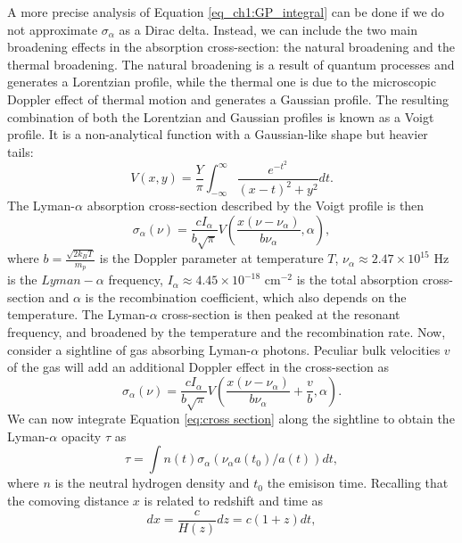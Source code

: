 A more precise analysis of Equation \ref{eq_ch1:GP_integral} can be done if we do not approximate $\sigma_\alpha$ as a Dirac delta. Instead, we can include the two main broadening effects in the absorption cross-section: the natural broadening and the thermal broadening. The natural broadening is a result of quantum processes and generates a Lorentzian profile, while the thermal one is due to the microscopic Doppler effect of thermal motion and generates a Gaussian profile. The resulting combination of both the Lorentzian and Gaussian profiles is known as a Voigt profile. It is a non-analytical function with a Gaussian-like shape but heavier tails:
\begin{equation}\label{eq: Voigt}
    V(x,y)=\frac{Y}{\pi}\int_{-\infty}^{\infty}\frac{e^{-t^2}}{(x-t)^2+y^2} dt.
\end{equation}
The Lyman-$\alpha$ absorption cross-section described by the Voigt profile is then
\begin{equation}
    \sigma_\alpha(\nu)=\frac{cI_\alpha}{b\sqrt{\pi}} V\left(\frac{x(\nu-\nu_\alpha)}{b\nu_\alpha}, \alpha  \right),
\end{equation}
where $b=\frac{\sqrt{2k_BT}}{m_p}$ is the Doppler parameter at temperature $T$, $\nu_\alpha \approx 2.47\times 10^{15}$ Hz is the $Lyman-\alpha$ frequency, $I_\alpha \approx 4.45\times 10^{-18}$ cm$^{-2}$ is the total absorption cross-section \cite{Mo2010} and $\alpha$ is the recombination coefficient, which also depends on the temperature.
The Lyman-$\alpha$ cross-section is then peaked at the resonant frequency, and broadened by the temperature and the recombination rate. Now, consider a sightline of gas absorbing Lyman-$\alpha$ photons. Peculiar bulk velocities $v$ of the gas will add an additional Doppler effect in the cross-section as
\begin{equation}\label{eq:cross section}
    \sigma_\alpha(\nu)=\frac{cI_\alpha}{b\sqrt{\pi}} V\left(\frac{x(\nu-\nu_\alpha)}{b\nu_\alpha} +\frac{v}{b}, \alpha  \right).
\end{equation}
We can now integrate Equation \ref{eq:cross section} along the sightline to obtain the Lyman-$\alpha$ opacity $\tau$ as
\begin{equation}
    \tau = \int n(t)\sigma_\alpha(\nu_\alpha a(t_0)/a(t)) dt,
\end{equation}
where $n$ is the neutral hydrogen density and $t_0$ the emisison time.
Recalling that the comoving distance $x$ is related to redshift and time as 
\begin{equation}
    dx=\frac{c}{H(z)}dz=c(1+z)dt,
\end{equation}
